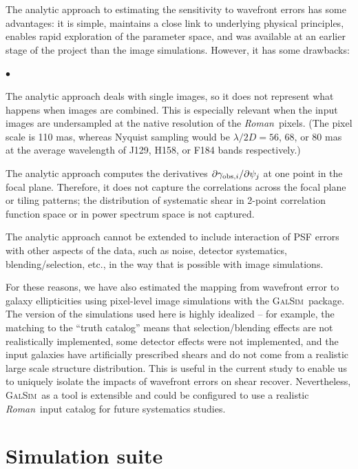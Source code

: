 \documentclass[usenatbib]{mnras}
\newcommand{\galsim}{\textsc{GalSim}}
\newcommand{\wfirst}{{\slshape Roman}}
\begin{document}
The analytic approach to estimating the sensitivity to wavefront errors has some advantages: it is simple, maintains a close link to underlying physical principles, enables rapid exploration of the parameter space, and was available at an earlier stage of the project than the image simulations. However, it has some drawbacks:
\begin{list}{$\bullet$}{}
\item The analytic approach deals with single images, so it does not represent what happens when images are combined. This is especially relevant when the input images are undersampled at the native resolution of the \wfirst\ pixels. (The pixel scale is 110 mas, whereas Nyquist sampling would be $\lambda/2D = 56$, 68, or 80 mas at the average wavelength of J129, H158, or F184 bands respectively.)
\item The analytic approach computes the derivatives $\partial\gamma_{{\rm obs},i}/\partial\psi_j$ at one point in the focal plane. Therefore, it does not capture the correlations across the focal plane or tiling patterns; the distribution of systematic shear in 2-point correlation function space or in power spectrum space is not captured.
\item The analytic approach cannot be extended to include interaction of PSF errors with other aspects of the data, such as noise, detector systematics, blending/selection, etc., in the way that is possible with image simulations.
\end{list}
For these reasons, we have also estimated the mapping from wavefront error to galaxy ellipticities using pixel-level image simulations with the \galsim\ package. The version of the simulations used here is highly idealized -- for example, the matching to the ``truth catalog'' means that selection/blending effects are not realistically implemented, some detector effects were not implemented, and the input galaxies have artificially prescribed shears and do not come from a realistic large scale structure distribution. This is useful in the current study to enable us to uniquely isolate the impacts of wavefront errors on shear recover. Nevertheless, \galsim\ as a tool is extensible and could be configured to use a realistic \wfirst\ input catalog for future systematics studies.

\section{Simulation suite}\label{sec:sim}
\end{document}

